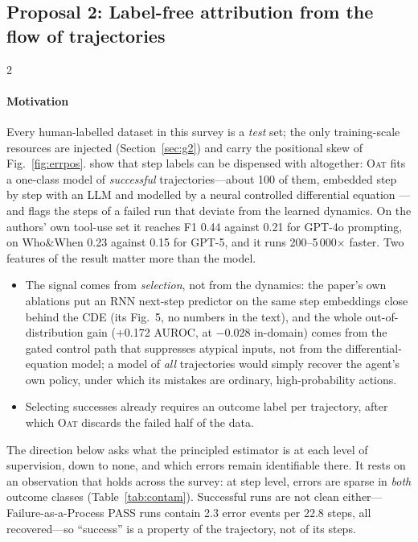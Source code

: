 \subsection{Proposal 2: Label-free attribution from the flow of trajectories}\label{sec:future:unsup}

\begin{multicols}{2}
\paragraph{Motivation} Every human-labelled dataset in this survey is a \emph{test} set; the only training-scale resources are injected (Section~\ref{sec:g2}) and carry the positional skew of Fig.~\ref{fig:errpos}. \citet{yeh2026oat} show that step labels can be dispensed with altogether: \textsc{Oat} fits a one-class model of \emph{successful} trajectories---about 100 of them, embedded step by step with an LLM and modelled by a neural controlled differential equation \cite{kidger2020ncde}---and flags the steps of a failed run that deviate from the learned dynamics. On the authors' own tool-use set it reaches F1 0.44 against 0.21 for GPT-4o prompting, on Who\&When 0.23 against 0.15 for GPT-5, and it runs 200--5\,000$\times$ faster. Two features of the result matter more than the model.
\begin{itemize}[leftmargin=1.1em]
\item The signal comes from \emph{selection}, not from the dynamics: the paper's own ablations put an RNN next-step predictor on the same step embeddings close behind the CDE (its Fig.~5, no numbers in the text), and the whole out-of-distribution gain (+0.172 AUROC, at $-$0.028 in-domain) comes from the gated control path that suppresses atypical inputs, not from the differential-equation model; a model of \emph{all} trajectories would simply recover the agent's own policy, under which its mistakes are ordinary, high-probability actions. 
\item Selecting successes already requires an outcome label per trajectory, after which \textsc{Oat} discards the failed half of the data.
\end{itemize}
The direction below asks what the principled estimator is at each level of supervision, down to none, and which errors remain identifiable there. It rests on an observation that holds across the survey: at step level, errors are sparse in \emph{both} outcome classes (Table~\ref{tab:contam}). Successful runs are not clean either---Failure-as-a-Process PASS runs contain 2.3 error events per 22.8 steps, all recovered---so ``success'' is a property of the trajectory, not of its steps.


\end{multicols}
